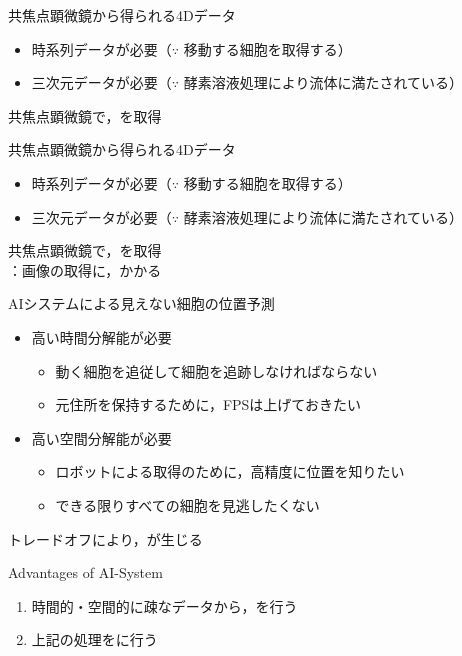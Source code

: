 \begin{frame}{共焦点顕微鏡から得られる4Dデータ}
    \begin{itemize}
        \item 時系列データが必要（$\because$ 移動する細胞を取得する）
        \item 三次元データが必要（$\because$ 酵素溶液処理により流体に満たされている）
    \end{itemize}
    \ra 共焦点顕微鏡\cite{paddock2000principles}で，を取得
    \\
\end{frame}
\begin{frame}[noframenumbering]{共焦点顕微鏡から得られる4Dデータ}
    \begin{itemize}
        \item 時系列データが必要（$\because$ 移動する細胞を取得する）
        \item 三次元データが必要（$\because$ 酵素溶液処理により流体に満たされている）
    \end{itemize}
    \ra 共焦点顕微鏡\cite{paddock2000principles}で，を取得
    \\\ra {}：画像の取得に，かかる
\end{frame}

\begin{frame}{AIシステムによる見えない細胞の位置予測}
    \begin{itemize}
        \item 高い時間分解能が必要
        \begin{itemize}
            \item 動く細胞を追従して細胞を追跡しなければならない
            \item 元住所を保持するために，FPSは上げておきたい
        \end{itemize}
        \vs
        \item 高い空間分解能が必要
        \begin{itemize}
            \item ロボットによる取得のために，高精度に位置を知りたい
            \item できる限りすべての細胞を見逃したくない
        \end{itemize}
    \end{itemize}
    \Ra トレードオフにより，が生じる
    \vs
    \begin{block}{Advantages of AI-System}
        \begin{enumerate}
            \item 時間的・空間的に疎なデータから，を行う
            \item 上記の処理をに行う
        \end{enumerate}
    \end{block}
\end{frame}